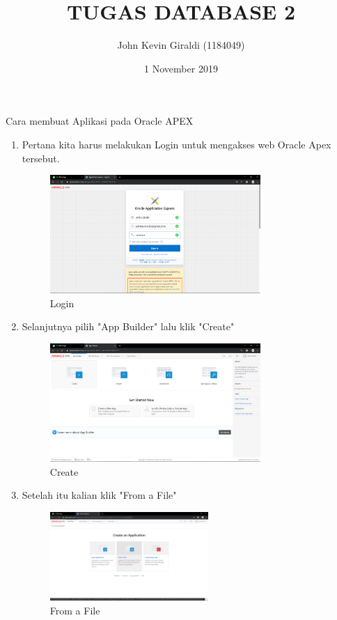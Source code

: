 \documentclass{article}
\title{TUGAS DATABASE 2}
\author{John Kevin Giraldi (1184049) }
\date{1 November 2019}
\begin{document}
\maketitle

\par
Cara membuat Aplikasi pada Oracle APEX
\begin{enumerate}
    \item Pertana kita harus melakukan Login untuk mengakses web Oracle Apex tersebut.
    \begin{figure}[h]
	\centering
	\includegraphics[width=8cm]{Figure/Login.png}
	\caption{Login}
	\label{fig:gambar}
	\end{figure}

    \item Selanjutnya pilih "App Builder" lalu klik "Create"
    \begin{figure}[h]
	\centering
	\includegraphics[width=8cm]{Figure/Create.png}
	\caption{Create}
	\label{fig:gambar}
	\end{figure}

    \item Setelah itu kalian klik "From a File"
    \begin{figure}[h]
	\centering
	\includegraphics[width=6cm]{Figure/FOF.png}
	\caption{From a File}
	\label{fig:gambar}
	\end{figure}


\end{enumerate}
\end{document}
